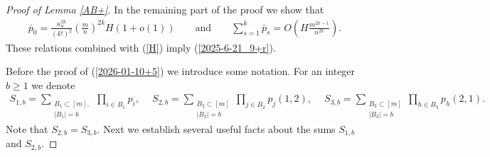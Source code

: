 \documentclass[10pt,a4paper]{amsart}
\begin{document}
\begin{proof}[ Proof of Lemma \ref{AB+}]
In the remaining part of the proof we show that
\begin{align}
\label{2026-01-10+5}
{\bar p}_0
=
\frac{\kappa_a^{2k}}{(k!)^2}
\left(
\frac{m}{n}
\right)^{2k}
H
\left(
1
+
o(1)
\right)
\qquad
{\text{and}}
\qquad
\sum_{s=1}^k {\bar p}_s
=
O\left(H\frac{m^{2k-1}}{n^{2k}}\right).
\end{align}
These relations combined with (\ref{H}) imply
(\ref{2025-6-21_9+r}).



Before the proof  of
(\ref{2026-01-10+5}) 
we introduce some notation.
For an integer $b\ge 1$ we denote
\begin{align*}
S_{1,b}
=\sum_
{\substack{B_1\subset [m],\\ |B_1|=b}}
\prod_{i\in B_1}
p_i,
\quad
\
S_{2,b}=
\sum_{\substack{B_2\subset [m]\\
|B_2|=b}}
\prod_{j\in B_2}p_j(1,2),
\quad
\
S_{3,b}=
\sum_{\substack{B_3\subset [m]\\
|B_3|=b}}
\prod_{h\in B_3}p_h(2,1).
\end{align*}
Note that $S_{2,b}=S_{3,b}$.
Next we establish several useful facts about the sums $S_{1,b}$ and $S_{2,b}$.


\end{proof}
\end{document}
